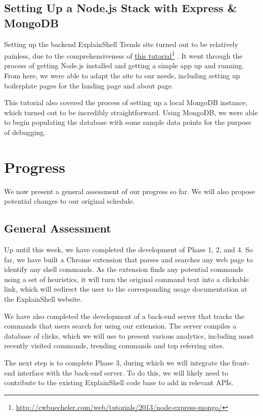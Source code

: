 \documentclass[11pt]{article}
\newcommand\fnurl[2]{%
\href{#1}{#2}\footnote{\url{#1}}%
}
\begin{document}
\subsection{Setting Up a Node.js Stack with Express \& MongoDB}

Setting up the backend ExplainShell Trends site turned out to be relatively
painless, due to the comprehensiveness of
\fnurl{http://cwbuecheler.com/web/tutorials/2013/node-express-mongo/}{this
tutorial}. It went through the process of getting Node.js installed and getting
a simple app up and running. From here, we were able to adapt the site to our
needs, including setting up boilerplate pages for the landing page and about
page.

This tutorial also covered the process of setting up a local MongoDB instance,
which turned out to be incredibly straightforward. Using MongoDB, we were able
to begin populating the database with some sample data points for the purpose of
debugging.

\section{Progress}

We now present a general assessment of our progress so far. We will
also propose potential changes to our original schedule.

\subsection{General Assessment}
Up until this week, we have completed the development of Phase 1, 2, and 4.
So far, we have built a Chrome extension that parses and searches any web page
to identify any shell commands. As the extension finds any potential
commands using a set of heuristics, it will turn the original command text
into a clickable link, which will redirect the user to the corresponding
usage documentation at the ExplainShell website.

We have also completed the development of a back-end server that tracks
the commands that users search for using our extension. The server compiles
a database of clicks, which we will use to present various analytics,
including most recently visited commands, trending commands and top referring
sites.

The next step is to complete Phase 3, during which we will integrate the
front-end interface with the back-end server. To do this, we will likely need
to contribute to the existing ExplainShell code base to add in relevant APIs.
\end{document}
